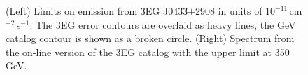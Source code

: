 \begin{figure}[p]
\caption{\label{FIG::OBSERVATIONS::J0433} (Left) Limits on 
emission from 3EG J0433$+$2908 in units of
$10^{-11}$\,cm$^{-2}$\,s$^{-1}$. The 3EG error contours are overlaid
as heavy lines, the GeV catalog contour is shown as a broken
circle. (Right) Spectrum from the on-line version of the 3EG catalog with
the upper limit at 350\,GeV.}
\end{figure}

